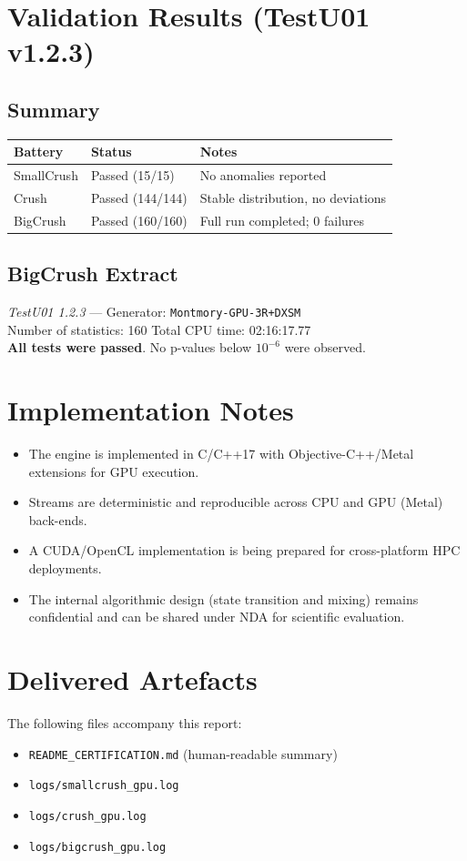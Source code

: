 \documentclass[11pt]{article}
\begin{document}
\section{Validation Results (TestU01 v1.2.3)}
\subsection*{Summary}
\begin{longtable}{@{}lll@{}}
\toprule
\textbf{Battery} & \textbf{Status} & \textbf{Notes} \\
\midrule
SmallCrush & Passed (15/15) & No anomalies reported \\
Crush & Passed (144/144) & Stable distribution, no deviations \\
BigCrush & Passed (160/160) & Full run completed; 0 failures \\
\bottomrule
\end{longtable}

\subsection*{BigCrush Extract}
\noindent\textit{TestU01 1.2.3} --- Generator: \texttt{Montmory-GPU-3R+DXSM}\\
Number of statistics: 160 \quad Total CPU time: 02:16:17.77\\
\textbf{All tests were passed}. No p-values below $10^{-6}$ were observed.

\section{Implementation Notes}
\begin{itemize}
  \item The engine is implemented in C/C++17 with Objective-C++/Metal extensions for GPU execution.
  \item Streams are deterministic and reproducible across CPU and GPU (Metal) back-ends.
  \item A CUDA/OpenCL implementation is being prepared for cross-platform HPC deployments.
  \item The internal algorithmic design (state transition and mixing) remains confidential and can be shared under NDA for scientific evaluation.
\end{itemize}

\section{Delivered Artefacts}
The following files accompany this report:
\begin{itemize}
  \item \texttt{README\_CERTIFICATION.md} (human-readable summary)
  \item \texttt{logs/smallcrush\_gpu.log}
  \item \texttt{logs/crush\_gpu.log}
  \item \texttt{logs/bigcrush\_gpu.log}
\end{itemize}
\end{document}

